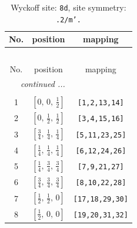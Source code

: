 \documentclass[fleqn,8pt]{jsarticle}
\begin{document}
\begin{longtable}{ccc}
\caption{Wyckoff site: {\tt 8d}, site symmetry: {\tt .2/m'.}}
 \\
 \hline \hline
No. & position & mapping \\ \hline \endfirsthead

\multicolumn{2}{l}{\tablename\ \thetable{}} \\
 \hline \hline
No. & position & mapping \\ \hline \endhead

 \hline \hline
\multicolumn{2}{r}{\footnotesize\it continued ...} \\ \endfoot

 \hline \hline
\multicolumn{2}{r}{} \\ \endlastfoot

1 & $\left[ 0,\, 0,\, \frac{1}{2} \right]$ & {\tt [1,2,13,14]} \\ \hline
2 & $\left[ 0,\, \frac{1}{2},\, \frac{1}{2} \right]$ & {\tt [3,4,15,16]} \\ \hline
3 & $\left[ \frac{3}{4},\, \frac{1}{4},\, \frac{1}{4} \right]$ & {\tt [5,11,23,25]} \\ \hline
4 & $\left[ \frac{1}{4},\, \frac{1}{4},\, \frac{1}{4} \right]$ & {\tt [6,12,24,26]} \\ \hline
5 & $\left[ \frac{1}{4},\, \frac{3}{4},\, \frac{3}{4} \right]$ & {\tt [7,9,21,27]} \\ \hline
6 & $\left[ \frac{3}{4},\, \frac{3}{4},\, \frac{3}{4} \right]$ & {\tt [8,10,22,28]} \\ \hline
7 & $\left[ \frac{1}{2},\, \frac{1}{2},\, 0 \right]$ & {\tt [17,18,29,30]} \\ \hline
8 & $\left[ \frac{1}{2},\, 0,\, 0 \right]$ & {\tt [19,20,31,32]} \\
\end{longtable}
\renewcommand{\arraystretch}{1.2}
\end{document}
